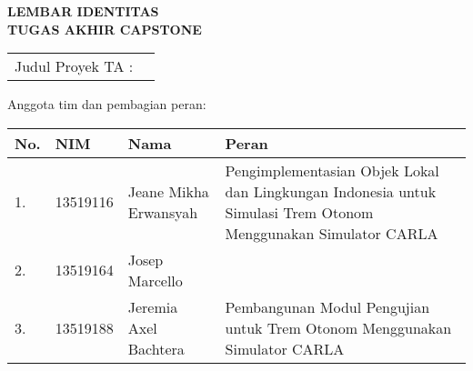 \clearpage
\pagestyle{empty}

\begin{center}
	\smallskip

	\Large \bfseries \MakeUppercase{
		Lembar Identitas \\
		Tugas Akhir Capstone
	}
	\vspace{0.5cm}

	\raggedright
	\begin{table}[h!]
		\large \bfseries
		\begin{tabular}{p{} p{}}
			Judul Proyek TA : & \capstoneTitle
		\end{tabular}
	\end{table}

	\normalsize \normalfont

	Anggota tim dan pembagian peran:

	\begin{table}[h!]
		\begin{tabular}{|p{} | p{} | p{} | p{}|}
			\hline
			\textbf{No.} & \textbf{NIM} & \textbf{Nama}         & \textbf{Peran}                                                                                                 \\
			\hline
			1.           & 13519116     & Jeane Mikha Erwansyah & Pengimplementasian Objek Lokal dan Lingkungan Indonesia untuk Simulasi Trem Otonom Menggunakan Simulator CARLA \\
			\hline
			2.           & 13519164     & Josep Marcello        & \thetitle                                 \\
			\hline
			3.           & 13519188     & Jeremia Axel Bachtera & Pembangunan Modul Pengujian untuk Trem Otonom Menggunakan Simulator CARLA \\
			\hline
		\end{tabular}
	\end{table}

	\vfill
	\pembimbingTtd

\end{center}
\clearpage

